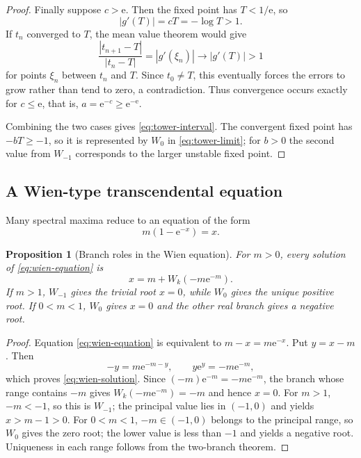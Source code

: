 \documentclass[11pt]{article}
\numberwithin{equation}{section}
\newtheorem{proposition}[theorem]{Proposition}
\theoremstyle{definition}
\theoremstyle{remark}
\newcommand{\e}{\mathrm e}
\begin{document}
\begin{proof}
Finally suppose $c>\e$.  Then the fixed point has $T<1/\e$, so
\[
 |g'(T)|=cT=-\log T>1.
\]
If $t_n$ converged to $T$, the mean value theorem would give
\[
 \frac{|t_{n+1}-T|}{|t_n-T|}=|g'(\xi_n)|\longrightarrow|g'(T)|>1
\]
for points $\xi_n$ between $t_n$ and $T$.  Since $t_0\ne T$, this eventually
forces the errors to grow rather than tend to zero, a contradiction.
Thus convergence occurs exactly for $c\le\e$, that is,
$a=\e^{-c}\ge\e^{-\e}$.

Combining the two cases gives \eqref{eq:tower-interval}.  The convergent fixed
point has $-bT\ge-1$, so it is represented by $W_0$ in
\eqref{eq:tower-limit}; for $b>0$ the second value from $W_{-1}$ corresponds
to the larger unstable fixed point.
\end{proof}

\subsection{A Wien-type transcendental equation}

Many spectral maxima reduce to an equation of the form
\begin{equation}
  m(1-\e^{-x})=x.                                      \label{eq:wien-equation}
\end{equation}

\begin{proposition}[Branch roles in the Wien equation]
\label{prop:wien}
For $m>0$, every solution of \eqref{eq:wien-equation} is
\begin{equation}
  x=m+W_k(-m\e^{-m}).                                  \label{eq:wien-solution}
\end{equation}
If $m>1$, $W_{-1}$ gives the trivial root $x=0$, while $W_0$ gives the unique
positive root.  If $0<m<1$, $W_0$ gives $x=0$ and the other real branch gives
a negative root.
\end{proposition}

\begin{proof}
Equation \eqref{eq:wien-equation} is equivalent to
$m-x=m\e^{-x}$.  Put $y=x-m$.  Then
\[
 -y=m\e^{-m-y},
 \qquad
 y\e^y=-m\e^{-m},
\]
which proves \eqref{eq:wien-solution}.  Since
$(-m)\e^{-m}=-m\e^{-m}$, the branch whose range contains $-m$ gives
$W_k(-m\e^{-m})=-m$ and hence $x=0$.  For $m>1$, $-m<-1$, so this is
$W_{-1}$; the principal value lies in $(-1,0)$ and yields
$x>m-1>0$.  For $0<m<1$, $-m\in(-1,0)$ belongs to the principal range, so
$W_0$ gives the zero root; the lower value is less than $-1$ and yields a
negative root.  Uniqueness in each range follows from the two-branch theorem.
\end{proof}
\end{document}
